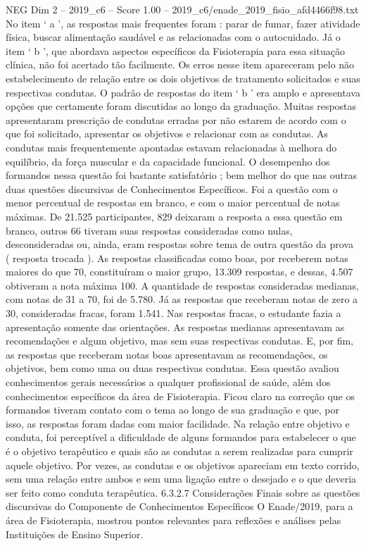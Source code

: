 \begin{textsample}{NEG Dim 2 – 2019\_c6 – Score 1.00 – 2019\_c6/enade\_2019\_fisio\_afd4466f98.txt}
No item ‘ a ’, as respostas mais frequentes foram : parar de fumar, fazer atividade física, buscar alimentação saudável e as relacionadas com o autocuidado.
Já o item ‘ b ’, que abordava aspectos específicos da Fisioterapia para essa situação clínica, não foi acertado tão facilmente.
Os erros nesse item apareceram pelo não estabelecimento de relação entre os dois objetivos de tratamento solicitados e suas respectivas condutas.
O padrão de respostas do item ‘ b ’ era amplo e apresentava opções que certamente foram discutidas ao longo da graduação.
Muitas respostas apresentaram prescrição de condutas erradas por não estarem de acordo com o que foi solicitado, apresentar os objetivos e relacionar com as condutas.
As condutas mais frequentemente apontadas estavam relacionadas à melhora do equilíbrio, da força muscular e da capacidade funcional.
O desempenho dos formandos nessa questão foi bastante satisfatório ; bem melhor do que nas outras duas questões discursivas de Conhecimentos Específicos.
Foi a questão com o menor percentual de respostas em branco, e com o maior percentual de notas máximas.
De 21.525 participantes, 829 deixaram a resposta a essa questão em branco, outros 66 tiveram suas respostas consideradas como nulas, desconsideradas ou, ainda, eram respostas sobre tema de outra questão da prova ( resposta trocada ).
As respostas classificadas como boas, por receberem notas maiores do que 70, constituíram o maior grupo, 13.309 respostas, e dessas, 4.507 obtiveram a nota máxima 100.
A quantidade de respostas consideradas medianas, com notas de 31 a 70, foi de 5.780.
Já as respostas que receberam notas de zero a 30, consideradas fracas, foram 1.541.
Nas respostas fracas, o estudante fazia a apresentação somente das orientações.
As respostas medianas apresentavam as recomendações e algum objetivo, mas sem suas respectivas condutas.
E, por fim, as respostas que receberam notas boas apresentavam as recomendações, os objetivos, bem como uma ou duas respectivas condutas.
Essa questão avaliou conhecimentos gerais necessários a qualquer profissional de saúde, além dos conhecimentos específicos da área de Fisioterapia.
Ficou claro na correção que os formandos tiveram contato com o tema ao longo de sua graduação e que, por isso, as respostas foram dadas com maior facilidade.
Na relação entre objetivo e conduta, foi perceptível a dificuldade de alguns formandos para estabelecer o que é o objetivo terapêutico e quais são as condutas a serem realizadas para cumprir aquele objetivo.
Por vezes, as condutas e os objetivos apareciam em texto corrido, sem uma relação entre ambos e sem uma ligação entre o desejado e o que deveria ser feito como conduta terapêutica. 6.3.2.7 Considerações Finais sobre as questões discursivas do Componente de Conhecimentos Específicos O Enade/2019, para a área de Fisioterapia, mostrou pontos relevantes para reflexões e análises pelas Instituições de Ensino Superior.

\end{textsample}
